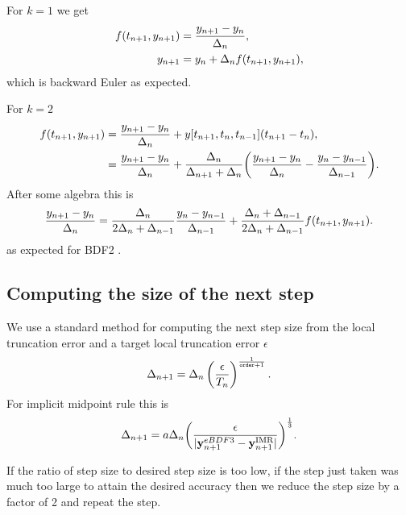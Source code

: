 For $k=1$ we get
\begin{equation}
  \begin{aligned}
    f(t_{n+1}, y_{n+1}) &= \frac{y_{n+1} - y_n}{\Delta_{n}}, \\
    y_{n+1} &= y_n + \Delta_{n} f(t_{n+1}, y_{n+1}),
  \end{aligned}
\end{equation}
which is backward Euler as expected.

For $k=2$
\begin{equation}
  \label{eqn:bdf2-derivation}
  \begin{aligned}
    f(t_{n+1}, y_{n+1}) &= \frac{y_{n+1} - y_n}{\Delta_{n}} +  y[t_{n+1}, t_{n}, t_{n-1}](t_{n+1} - t_n), \\
    &= \frac{y_{n+1} - y_n}{\Delta_{n}} +  \frac{\Delta_{n}}{\Delta_{n+1} + \Delta_{n}} {\left( \frac{y_{n+1} - y_n}{\Delta_{n}} - \frac{y_n - y_{n-1}}{\Delta_{n-1}} \right)}. \\
  \end{aligned}
\end{equation}
After some algebra this is
\begin{equation}
  \label{eqn:bdf2-derivation-rearranged}
  \begin{aligned}
    \frac{y_{n+1} - y_n}{\Delta_{n}} = \frac{\Delta_{n}}{2\Delta_{n} + \Delta_{n-1}} \frac{y_n - y_{n-1}}{\Delta_{n-1}} 
    + \frac{\Delta_{n} + \Delta_{n-1}}{2\Delta_{n} + \Delta_{n-1}} f(t_{n+1}, y_{n+1}).
  \end{aligned}
\end{equation}
as expected for BDF2 \cite[pg. 715]{GreshoSani}.


\subsection{Computing the size of the next step}

\renewcommand{\toltt}{\epsilon}

We use a standard method \cite[pg.268]{Gresho-Sani} for computing the next step size from the local truncation error and a target local truncation error $\toltt$
\begin{equation}
\dtx{n+1} = \dtn \left( \frac{\toltt}{\lte}  \right) ^{\frac{1}{\texttt{order}+1}}.
\end{equation}
For implicit midpoint rule this is
\begin{equation}
  \dtx{n+1} = a \dtn \bigb{ \frac{\toltt}{\abs{\yv_{n+1}^{eBDF3} - \yv_{n+1}^\imr}} }^{\frac{1}{3}}.
\end{equation}

If the ratio of step size to desired step size is too low, \ie if the step just taken was much too large to attain the desired accuracy then we reduce the step size by a factor of 2 and repeat the step.

